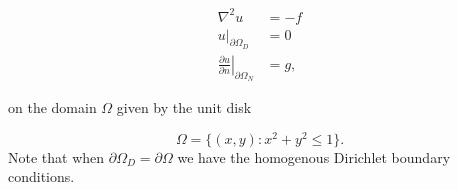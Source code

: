 \documentclass[5p,a4paper,english]{elsarticle}%
\newcommand\restr[2]{\ensuremath{\left.#1\right|_{#2}}}
\begin{document}
\begin{equation}
\begin{aligned}
    \nabla^2 u &= - f \\
    \restr{u}{\partial \Omega_{D}}  &= 0 \\
    \restr{\frac{\partial u}{\partial n}}{\partial \Omega_{N}} &= g,
\label{poission-problem}
\end{aligned}
\end{equation}

on the domain $\Omega$ given by the unit disk

\begin{equation*}
    \Omega = \{(x,y) : x^2+ y^2 \leq 1 \}.
\end{equation*}
Note that when $\partial \Omega_{D} = \partial \Omega$ we have the homogenous Dirichlet boundary conditions. 
\end{document}
